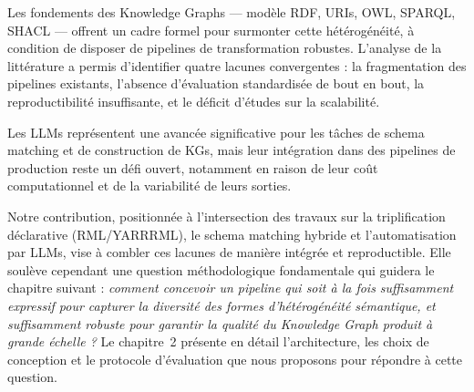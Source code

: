 Les fondements des Knowledge Graphs — modèle RDF, URIs, OWL, SPARQL, SHACL — offrent un cadre formel pour surmonter cette hétérogénéité, à condition de disposer de pipelines de transformation robustes. L'analyse de la littérature a permis d'identifier quatre lacunes convergentes : la fragmentation des pipelines existants, l'absence d'évaluation standardisée de bout en bout, la reproductibilité insuffisante, et le déficit d'études sur la scalabilité.

Les LLMs représentent une avancée significative pour les tâches de schema matching et de construction de KGs, mais leur intégration dans des pipelines de production reste un défi ouvert, notamment en raison de leur coût computationnel et de la variabilité de leurs sorties.

Notre contribution, positionnée à l'intersection des travaux
sur la triplification déclarative (RML/YARRRML), le schema
matching hybride et l'automatisation par LLMs, vise à combler
ces lacunes de manière intégrée et reproductible.
Elle soulève cependant une question méthodologique fondamentale
qui guidera le chapitre suivant : \textit{comment concevoir
un pipeline qui soit à la fois suffisamment expressif pour
capturer la diversité des formes d'hétérogénéité sémantique,
et suffisamment robuste pour garantir la qualité du Knowledge
Graph produit à grande échelle ?}
Le chapitre~2 présente en détail l'architecture, les choix
de conception et le protocole d'évaluation que nous
proposons pour répondre à cette question.